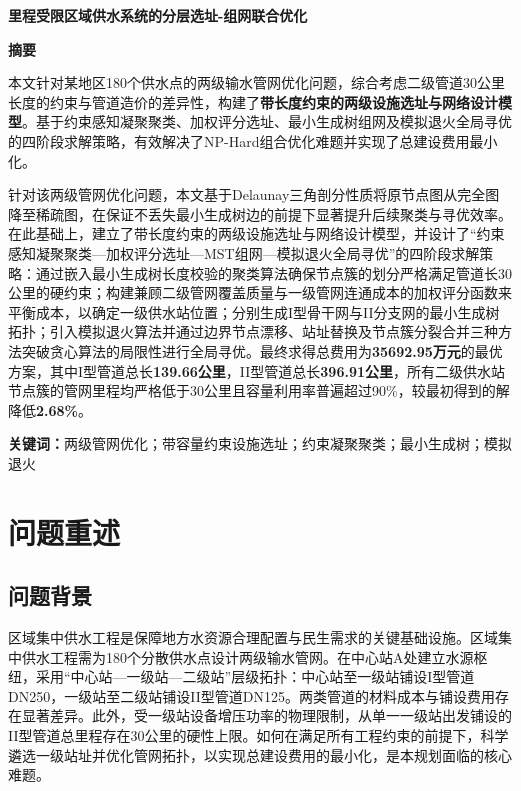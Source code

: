 \documentclass[12pt,a4paper]{ctexart}
\theoremstyle{definition}
\theoremstyle{plain}
\theoremstyle{remark}
\renewenvironment{abstract}
  {\begin{center}\heiti\zihao{-3}\bfseries 摘\quad 要\end{center}\zihao{-4}}
  {\par\vspace{1em}}
\newcommand{\keywords}[1]{%
  \par\noindent\textbf{关键词：}#1}
\begin{document}
\pagestyle{plain}

\begin{center}
{\heiti\bfseries 里程受限区域供水系统的分层选址-组网联合优化}
\end{center}
\vspace{1em}

\setcounter{page}{1}

\begin{abstract}
\setlength{\parindent}{2em}

\indent 本文针对某地区180个供水点的两级输水管网优化问题，综合考虑二级管道30公里长度的约束与管道造价的差异性，构建了\textbf{带长度约束的两级设施选址与网络设计模型}。基于约束感知凝聚聚类、加权评分选址、最小生成树组网及模拟退火全局寻优的四阶段求解策略，有效解决了NP-Hard组合优化难题并实现了总建设费用最小化。

\indent 针对该两级管网优化问题，本文基于Delaunay三角剖分性质将原节点图从完全图降至稀疏图，在保证不丢失最小生成树边的前提下显著提升后续聚类与寻优效率。在此基础上，建立了带长度约束的两级设施选址与网络设计模型，并设计了``约束感知凝聚聚类—加权评分选址—MST组网—模拟退火全局寻优''的四阶段求解策略：通过嵌入最小生成树长度校验的聚类算法确保节点簇的划分严格满足管道长30公里的硬约束；构建兼顾二级管网覆盖质量与一级管网连通成本的加权评分函数来平衡成本，以确定一级供水站位置；分别生成I型骨干网与II分支网的最小生成树拓扑；引入模拟退火算法并通过边界节点漂移、站址替换及节点簇分裂合并三种方法突破贪心算法的局限性进行全局寻优。最终求得总费用为\textbf{35692.95万元}的最优方案，其中I型管道总长\textbf{139.66公里}，II型管道总长\textbf{396.91公里}，所有二级供水站节点簇的管网里程均严格低于30公里且容量利用率普遍超过90\%，较最初得到的解降低\textbf{2.68\%}。
\end{abstract}

\keywords{两级管网优化；带容量约束设施选址；约束凝聚聚类；最小生成树；模拟退火}
\newpage


\section{问题重述}
\subsection{问题背景}
区域集中供水工程是保障地方水资源合理配置与民生需求的关键基础设施。区域集中供水工程需为180个分散供水点设计两级输水管网。在中心站A处建立水源枢纽，采用“中心站—一级站—二级站”层级拓扑：中心站至一级站铺设I型管道DN250，一级站至二级站铺设II型管道DN125。两类管道的材料成本与铺设费用存在显著差异。此外，受一级站设备增压功率的物理限制，从单一一级站出发铺设的II型管道总里程存在30公里的硬性上限。如何在满足所有工程约束的前提下，科学遴选一级站址并优化管网拓扑，以实现总建设费用的最小化，是本规划面临的核心难题。
\end{document}
